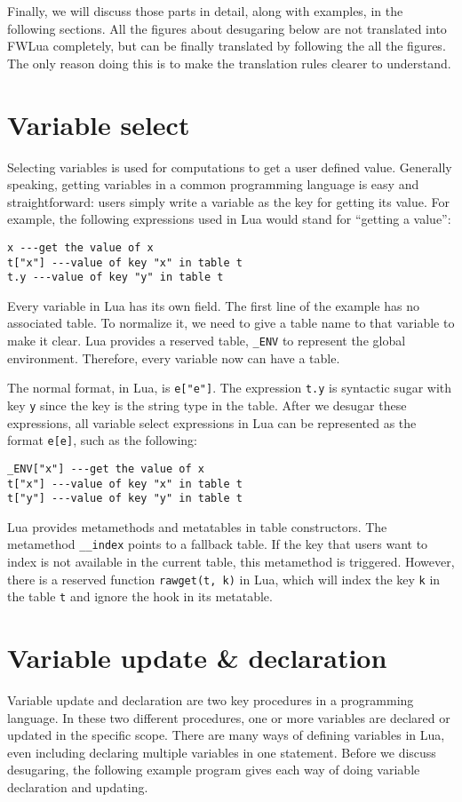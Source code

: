 Finally, we will discuss those parts in detail, along with examples, in the following sections. All the figures about desugaring below are not translated into FWLua completely, but can be finally translated by following the all the figures. The only reason doing this is to make the translation rules clearer to understand.

\section{Variable select}
Selecting variables is used for computations to get a user defined value. Generally speaking, getting variables in a common programming language is easy and straightforward: users simply write a variable as the key for getting its value. For example, the following expressions used in Lua would stand for ``getting a value'':

\begin{verbatim}
x ---get the value of x
t["x"] ---value of key "x" in table t
t.y ---value of key "y" in table t
\end{verbatim}

Every variable in Lua has its own field. 
The first line of the example has no associated table.
To normalize it, we need to give a table name to that variable to make it clear.
Lua provides a reserved table, {\tt \_ENV} to represent the global environment. Therefore, every variable now can have a table.

The normal format, in Lua, is {\tt e["e"]}. 
The expression {\tt t.y} is syntactic sugar with key {\tt y} since the key is the string type in the table. After we desugar these expressions, all variable select expressions in Lua can be represented as the format {\tt e[e]}, such as the following:

\begin{verbatim}
_ENV["x"] ---get the value of x
t["x"] ---value of key "x" in table t
t["y"] ---value of key "y" in table t
\end{verbatim}

Lua provides metamethods and metatables in table constructors. The metamethod {\tt \_\_index} points to a fallback table. If the key that users want to index is not available in the current table, this metamethod is triggered. However, there is a reserved function {\tt rawget(t, k)} in Lua, which will index the key {\tt k} in the table {\tt t} and ignore the hook in its metatable.

\section{Variable update \& declaration}\label{sec:desugarVarUpdate}
Variable update and declaration are two key procedures in a programming language. 
In these two different procedures, one or more variables are declared or updated in the specific scope. There are many ways of defining variables in Lua, even including declaring multiple variables in one statement. Before we discuss desugaring, the following example program gives each way of doing variable declaration and updating.

